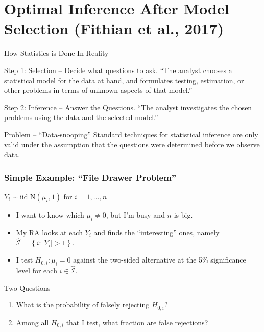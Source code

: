 \section{Optimal Inference After Model Selection (Fithian et al., 2017)}

\begin{frame}{How Statistics is Done In Reality}

  \begin{block}{Step 1: Selection -- Decide what questions to ask.}
    ``The analyst chooses a statistical model for the data at hand, and formulates testing, estimation, or other problems in terms of unknown aspects of that model.''
  \end{block}

  \begin{block}{Step 2: Inference -- Answer the Questions.}
   ``The analyst investigates the chosen problems using the data and the selected model.''
  \end{block}

  \begin{alertblock}{Problem -- ``Data-snooping''}
    Standard techniques for statistical inference are only valid under the assumption that the questions were determined \alert{before} we observe data.  
  \end{alertblock}

\end{frame}
\begin{frame}
  \frametitle{Simple Example: ``File Drawer Problem''}

  \begin{block}{$Y_i \sim \mbox{iid N}(\mu_i, 1)$ for $i=1, \dots, n$}
  \begin{itemize}
    \item I want to know which $\mu_i \neq 0$, but I'm busy and $n$ is big.
    \item My RA looks at each $Y_i$ and finds the ``interesting'' ones, namely $\widehat{\mathcal{I}} =\left\{ i\colon |Y_i|>1 \right\}$.
    \item I test $H_{0,i}\colon \mu_i = 0$ against the two-sided alternative at the 5\% significance level for each $i \in \widehat{\mathcal{I}}$.
  \end{itemize}
\end{block}

  \begin{alertblock}{Two Questions}
    \begin{enumerate}
      \item What is the probability of falsely rejecting $H_{0,i}$?
      \item Among all $H_{0,i}$ that I test, what fraction are false rejections? 
    \end{enumerate}
  \end{alertblock}

\end{frame}
